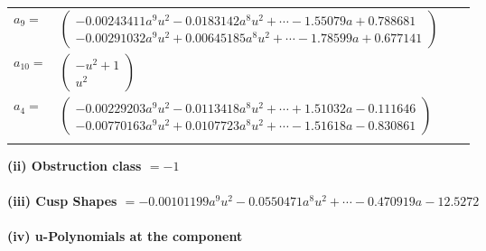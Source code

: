\documentclass[1p]{elsarticle_modified}
\theoremstyle{definition}
\begin{document}
\begin{tabular}{m{7pt} m{180pt} m{7pt} m{180pt} }
\flushright $a_{9}=$&$\begin{pmatrix}-0.00243411 a^{9} u^{2}-0.0183142 a^{8} u^{2}+\cdots-1.55079 a+0.788681\\-0.00291032 a^{9} u^{2}+0.00645185 a^{8} u^{2}+\cdots-1.78599 a+0.677141\end{pmatrix}$ \\
\flushright $a_{10}=$&$\begin{pmatrix}- u^2+1\\u^2\end{pmatrix}$ \\
\flushright $a_{4}=$&$\begin{pmatrix}-0.00229203 a^{9} u^{2}-0.0113418 a^{8} u^{2}+\cdots+1.51032 a-0.111646\\-0.00770163 a^{9} u^{2}+0.0107723 a^{8} u^{2}+\cdots-1.51618 a-0.830861\end{pmatrix}$\\&\end{tabular}
\flushleft \textbf{(ii) Obstruction class $= -1$}\\~\\
\flushleft \textbf{(iii) Cusp Shapes $= -0.00101199 a^{9} u^{2}-0.0550471 a^{8} u^{2}+\cdots-0.470919 a-12.5272$}\\~\\
\newpage\renewcommand{\arraystretch}{1}
\flushleft \textbf{(iv) u-Polynomials at the component}\newline \\
\end{document}
